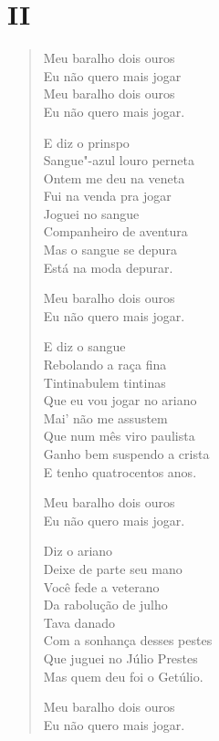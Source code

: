 \pagebreak
\section*{II}

\begin{verse}
\qquad\qquad\quad Meu baralho dois ouros\\
\qquad\qquad\quad Eu não quero mais jogar\\
\qquad\qquad\quad Meu baralho dois ouros\\
\qquad\qquad\quad Eu não quero mais jogar.

E diz o prinspo\\
Sangue"-azul louro perneta\\
Ontem me deu na veneta\\
Fui na venda pra jogar\\
Joguei no sangue\\
Companheiro de aventura\\
Mas o sangue se depura\\
Está na moda depurar.

\qquad\qquad\quad Meu baralho dois ouros\\
\qquad\qquad\quad Eu não quero mais jogar.

E diz o sangue\\
Rebolando a raça fina\\
Tintinabulem tintinas\\
Que eu vou jogar no ariano\\
Mai' não me assustem\\
Que num mês viro paulista\\
Ganho bem suspendo a crista\\
E tenho quatrocentos anos.

\qquad\qquad\quad Meu baralho dois ouros\\
\qquad\qquad\quad Eu não quero mais jogar.

Diz o ariano\\
Deixe de parte seu mano\\
Você fede a veterano\\
Da rabolução de julho\\
Tava danado\\
Com a sonhança desses pestes\\
Que juguei no Júlio Prestes\\
Mas quem deu foi o Getúlio.

\qquad\qquad\quad Meu baralho dois ouros\\
\qquad\qquad\quad Eu não quero mais jogar.


\end{verse}
